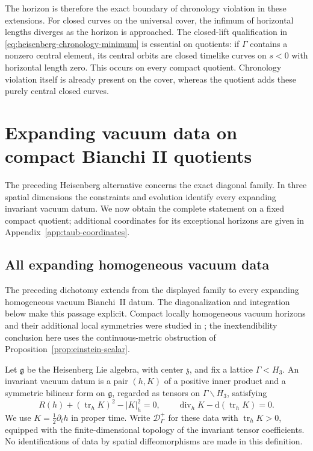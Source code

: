 \documentclass[10pt,a4paper]{article}
\numberwithin{equation}{section}
\theoremstyle{definition}
\theoremstyle{remark}
\newcommand{\dd}{\mathrm d}
\begin{document}
The horizon is therefore the exact boundary of chronology violation
in these extensions.  For closed curves on the universal cover,
the infimum of horizontal lengths diverges as the horizon is approached.
The closed-lift qualification in
\eqref{eq:heisenberg-chronology-minimum} is essential on quotients:
if $\Gamma$ contains a nonzero central element, its central orbits
are closed timelike curves on $s<0$ with horizontal length zero.
This occurs on every compact quotient.  Chronology violation
itself is already present on the cover, whereas the quotient adds
these purely central closed curves.

\section{Expanding vacuum data on compact Bianchi II quotients}
\label{sec:taub}

The preceding Heisenberg alternative concerns the exact diagonal family.
In three spatial dimensions the constraints and evolution identify every
expanding invariant vacuum datum.  We now obtain the complete statement
on a fixed compact quotient; additional coordinates for its exceptional
horizons are given in Appendix~\ref{app:taub-coordinates}.

\subsection{All expanding homogeneous vacuum data}
\label{subsec:all-vacuum-data}

The preceding dichotomy extends from the displayed family to every
expanding homogeneous vacuum Bianchi~II datum.  The diagonalization and
integration below make this passage explicit.  Compact locally homogeneous
vacuum horizons and their additional local symmetries were studied in
\cite{ChruscielRendall1995}; the inextendibility conclusion here uses the
continuous-metric obstruction of Proposition~\ref{prop:einstein-scalar}.

Let $\mathfrak g$ be the Heisenberg Lie algebra, with center
$\mathfrak z$, and fix a lattice $\Gamma<H_3$.  An invariant vacuum
datum is a pair $(h,K)$ of a positive inner product and a symmetric
bilinear form on $\mathfrak g$, regarded as tensors on
$\Gamma\backslash H_3$, satisfying
\begin{equation}
 R(h)+(\operatorname{tr}_hK)^2-|K|_h^2=0,
 \qquad \operatorname{div}_hK-\dd(\operatorname{tr}_hK)=0.
 \label{eq:all-vacuum-constraints}
\end{equation}
We use $K=\tfrac12\partial_t h$ in proper time.  Write
$\mathscr D^+_\Gamma$ for these data with
$\operatorname{tr}_hK>0$, equipped with the finite-dimensional topology
of the invariant tensor coefficients.  No identifications of data by
spatial diffeomorphisms are made in this definition.
\end{document}
